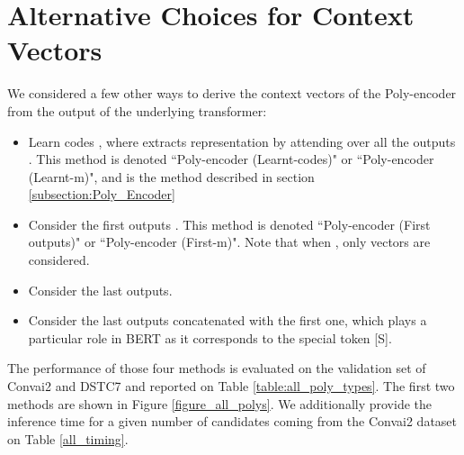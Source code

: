 \documentclass{article} \usepackage{iclr2020_conference,times}
\begin{document}
\section{Alternative Choices for Context Vectors}
\label{section:alternative_ctxt_vecs}

We considered a few other ways to derive the context vectors  of the Poly-encoder from the output  of the underlying transformer: 
\begin{itemize}
    \item  Learn  codes , where  extracts representation  by attending over all the outputs  . This method is denoted ``Poly-encoder (Learnt-codes)" or ``Poly-encoder (Learnt-m)", and is the method described in section \ref{subsection:Poly_Encoder}
    \item Consider the first  outputs . This method is denoted ``Poly-encoder (First  outputs)" or ``Poly-encoder (First-m)". Note that when , only  vectors are considered.
    \item Consider the last  outputs.
    \item Consider the last  outputs concatenated with the first one,  which plays a particular role in BERT as it corresponds to the special token [S].
\end{itemize}
The performance of those four methods is evaluated on the validation set of Convai2 and DSTC7 and reported on Table \ref{table:all_poly_types}. The first two methods are shown in Figure \ref{figure_all_polys}. We additionally provide the inference time for a given number of candidates coming from the Convai2 dataset on Table \ref{all_timing}.
\end{document}
